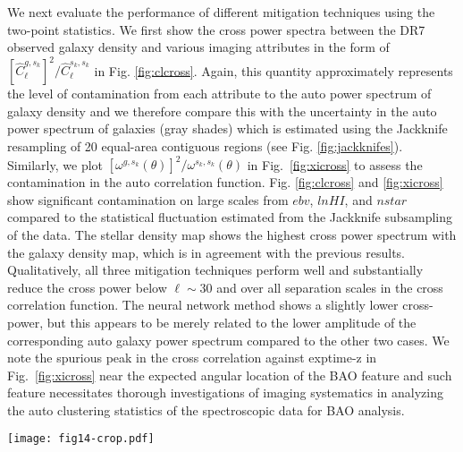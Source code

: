 \documentclass[fleqn, usenatbib]{mnras}
\begin{document}
We next evaluate the performance of different mitigation techniques using the two-point statistics. We first show the cross power spectra between the DR7 observed galaxy density and various imaging attributes in the form of  $[\hat{C}^{g,s_k}_{\ell}]^2/\hat{C}^{s_k,s_k}_{\ell}$ in Fig. \ref{fig:clcross}. Again, this quantity approximately represents the level of contamination from each attribute to the auto power spectrum of galaxy density and we therefore compare this with the uncertainty in the auto power spectrum of galaxies (gray shades) which is estimated using the Jackknife resampling of 20 equal-area contiguous regions (see Fig. \ref{fig:jackknifes}). Similarly, we plot $[\omega^{g,s_k}(\theta)]^2/\omega^{s_k,s_k}(\theta)$ in Fig.~\ref{fig:xicross} to assess the contamination in the auto correlation function. Fig. \ref{fig:clcross} and \ref{fig:xicross} show significant contamination on large scales from $ebv$, $lnHI$, and $nstar$ compared to the statistical fluctuation estimated from the Jackknife subsampling of the data. The stellar density map shows the highest cross power spectrum with the galaxy density map, which is in agreement with the previous results. Qualitatively, all three mitigation techniques perform well and substantially reduce the cross power below $\ell \sim 30$ and over all separation scales in the cross correlation function. The neural network method shows a slightly lower cross-power, but this appears to be merely related to the lower amplitude of the corresponding auto galaxy power spectrum compared to the other two cases. We note the spurious peak in the cross correlation against exptime-z in Fig.~\ref{fig:xicross} near the expected angular location of the BAO feature and such feature necessitates thorough investigations of imaging systematics in analyzing the auto clustering statistics of the spectroscopic data for BAO analysis.\\

\begin{figure*}
\centering
\texttt{[image: fig14-crop.pdf]}
\caption{The cross power spectrum $\hat{C}^{g,s_k}_{\ell}$ between the DR7 observed galaxy density and the imaging attributes $s_k$ normalized by the auto power spectrum of the imaging attribute $\hat{C}^{s_k,s_k}_{\ell}$. The plotted quantity $[\hat{C}^{g,s_k}_{\ell}]^2/\hat{C}^{s_k,s_k}_{\ell}$ approximately represents the level of contamination to the auto power spectrum of the galaxy density $\hat{C}^{g,g}_{\ell}$.  The grey shaded region shows the Jackknife error estimate of $\hat{C}^{g,g}_{\ell}$. The black solid curve shows the result before mitigation (\textit{no correction}), while the solid red curve shows the result after correcting for the systematics with the neural network selection mask. The dot-dashed and dashed black curves show the corrected results with the linear and quadratic polynomial model selection masks, respectively. \label{fig:clcross}}
\end{figure*}
\end{document}
